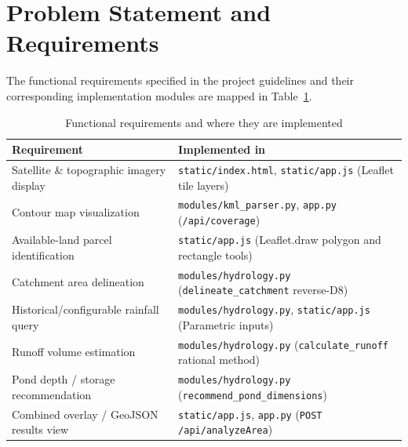\documentclass[manuscript,screen,review]{acmart}
\begin{document}
\section{Problem Statement and Requirements}
\label{sec:requirements}
The functional requirements specified in the project guidelines and their corresponding implementation modules are mapped in Table~\ref{tab:requirements}.

\begin{table}[h]
  \caption{Functional requirements and where they are implemented}
  \label{tab:requirements}
  \begin{tabular}{p{5.5cm}p{7.5cm}}
    \toprule
    Requirement & Implemented in \\
    \midrule
    Satellite \& topographic imagery display & \texttt{static/index.html}, \texttt{static/app.js} (Leaflet tile layers) \\
    Contour map visualization & \texttt{modules/kml\_parser.py}, \texttt{app.py} (\texttt{/api/coverage}) \\
    Available-land parcel identification & \texttt{static/app.js} (Leaflet.draw polygon and rectangle tools) \\
    Catchment area delineation & \texttt{modules/hydrology.py} (\texttt{delineate\_catchment} reverse-D8) \\
    Historical/configurable rainfall query & \texttt{modules/hydrology.py}, \texttt{static/app.js} (Parametric inputs) \\
    Runoff volume estimation & \texttt{modules/hydrology.py} (\texttt{calculate\_runoff} rational method) \\
    Pond depth / storage recommendation & \texttt{modules/hydrology.py} (\texttt{recommend\_pond\_dimensions}) \\
    Combined overlay / GeoJSON results view & \texttt{static/app.js}, \texttt{app.py} (\texttt{POST /api/analyzeArea}) \\
    \bottomrule
  \end{tabular}
\end{table}
\end{document}
